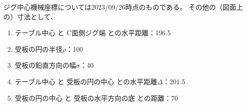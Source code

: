 \begin{hosoku}
ジグ中心機械座標については2023/09/26時点のものである。
その他の（図面上の）寸法として、
\begin{enumerate}
\item テーブル中心 と C面側ジグ端 との水平距離：196.5
\item 受板の円の半径$\rho$：100
\item 受板の鉛直方向の幅$\sigma$：40
\item テーブル中心 と 受板の円の中心 との水平距離$\varDelta$：201.5
\item 受板の円の中心 と 受板の水平方向の底 との距離：70
\end{enumerate}
\end{hosoku}



